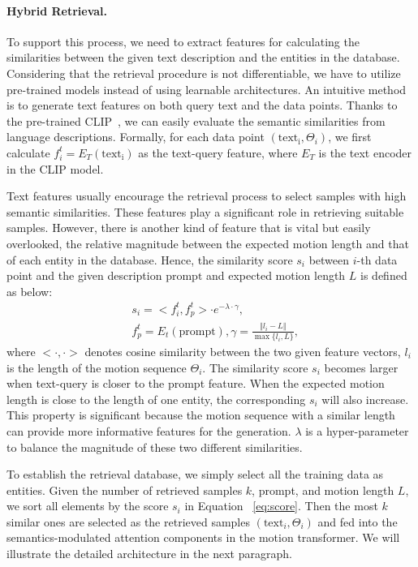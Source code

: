 \documentclass[10pt,twocolumn,letterpaper]{article}
\begin{document}
\paragraph{Hybrid Retrieval.} To support this process, we need to extract features for calculating the similarities between the given text description and the entities in the database. Considering that the retrieval procedure is not differentiable, we have to utilize pre-trained models instead of using learnable architectures. An intuitive method is to generate text features on both query text and the data points. Thanks to the pre-trained CLIP~\cite{radford2021learning}, we can easily evaluate the semantic similarities from language descriptions. Formally, for each data point $(\mathrm{text_i}, \Theta_i)$, we first calculate $f^{t}_i=E_{T}(\mathrm{text_i})$ as the text-query feature, where $E_{T}$ is the text encoder in the CLIP model.

Text features usually encourage the retrieval process to select samples with high semantic similarities. 
These features play a significant role in retrieving suitable samples. However, there is another kind of feature that is vital but easily overlooked, the relative magnitude between the expected motion length and that of each entity in the database. Hence, the similarity score $s_i$ between $i$-th data point and the given description $\mathrm{prompt}$ and expected motion length $L$ is defined as below:
\begin{equation}
\begin{aligned}
    &s_i = <f^t_i, f^t_p> \cdot e^{-\lambda \cdot \gamma}, \\
    &f^t_p = E_{t}(\mathrm{prompt}), \gamma = \frac{\Vert l_i - L \Vert}{\max\{l_i, L\}},
\label{eq:score}
\end{aligned}
\end{equation}
where $<\cdot,\cdot>$ denotes cosine similarity between the two given feature vectors, $l_i$ is the length of the motion sequence $\Theta_i$. The similarity score $s_i$ becomes larger when text-query is closer to the prompt feature. When the expected motion length is close to the length of one entity, the corresponding $s_i$ will also increase. This property is significant because the motion sequence with a similar length can provide more informative features for the generation. $\lambda$ is a hyper-parameter to balance the magnitude of these two different similarities. 

To establish the retrieval database, we simply select all the training data as entities. Given the number of retrieved samples $k$, prompt, and motion length $L$, we sort all elements by the score $s_i$ in Equation ~\ref{eq:score}. Then the most $k$ similar ones are selected as the retrieved samples $(\mathrm{text}_i, \Theta_i)$ and fed into the semantics-modulated attention components in the motion transformer. We will illustrate the detailed architecture in the next paragraph.
\end{document}
